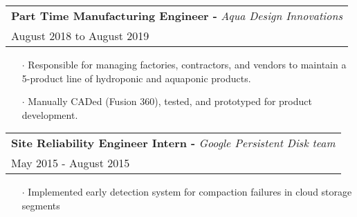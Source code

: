 \documentclass[letterpaper, oneside, final]{scrartcl} %
\begin{document}
\begin{center}
\begingroup\setlength{\fboxsep}{0pt}
\colorbox{mygray}{
\begin{flushleft}
\begin{tabularx}{\textwidth}{l}
\textbf{Part Time Manufacturing Engineer -} \textit{Aqua Design Innovations}\\
August 2018 to August 2019\\
\end{tabularx}
\end{flushleft}
}\endgroup
\vspace{-0.1cm}
\begin{itemize} \itemsep-0.2cm
\item[$\cdot$] Responsible for managing factories, contractors, and vendors to maintain a 5-product line of hydroponic and aquaponic products. \\
\item[$\cdot$] Manually CADed (Fusion 360), tested, and prototyped for product development.\\
\end{itemize}

\begingroup\setlength{\fboxsep}{0pt}
\colorbox{mygray}{
\begin{flushleft}
\begin{tabularx}{\textwidth}{l}
\textbf{Site Reliability Engineer Intern -} \textit{Google Persistent Disk team}\\
May 2015 - August 2015\\
\end{tabularx}
\end{flushleft}
}\endgroup
\vspace{-0.1cm}
\begin{itemize} \itemsep-0.2cm
\item[$\cdot$] Implemented early detection system for compaction failures in cloud storage segments\\
\end{itemize}

	
\vspace{-0.5cm}


\end{center}
\end{document}
